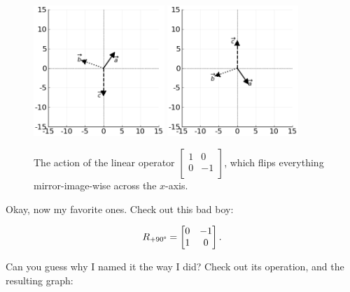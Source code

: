 \begin{figure}[hb]
\centering
\vspace{.2in}
\includegraphics[width=0.44\textwidth]{preoperators.png}
\includegraphics[width=0.44\textwidth]{vertFlipOp.png}
\caption[.]{The action of the linear operator 
{\scriptsize $\begin{bmatrix} 1 & 0 \\ 0 & -1 \\
\end{bmatrix}$,} which flips everything mirror-image-wise across the $x$-axis.}
\label{fig:vertFlipOp}
\end{figure}

\medskip

Okay, now my favorite ones. Check out this bad boy:

\vspace{-.15in}
\begin{align*}
R_{+90\degree} =
\begin{bmatrix}
0 & -1 \\
1 & 0 \\
\end{bmatrix}.
\end{align*}
\vspace{-.15in}

Can you guess why I named it the way I did? Check out its operation, and the
resulting graph:

